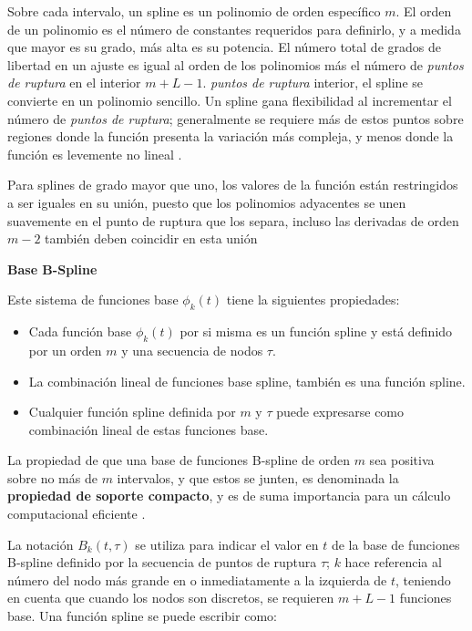 \documentclass[
]{book}
\begin{document}
Sobre cada intervalo, un spline es un polinomio de orden específico \(m\). El orden de un polinomio es el número de constantes requeridos para definirlo, y a medida que mayor es su grado, más alta es su potencia. El número total de grados de libertad en un ajuste es igual al orden de los polinomios más el número de \emph{puntos de ruptura} en el interior \(m+L-1\). \emph{puntos de ruptura} interior, el spline se convierte en un polinomio sencillo. Un spline gana flexibilidad al incrementar el número de \emph{puntos de ruptura}; generalmente se requiere más de estos puntos sobre regiones donde la función presenta la variación más compleja, y menos donde la función es levemente no lineal \citep{ramsay}.

Para splines de grado mayor que uno, los valores de la función están restringidos a ser iguales en su unión, puesto que los polinomios adyacentes se unen suavemente en el punto de ruptura que los separa, incluso las derivadas de orden \(m-2\) también deben coincidir en esta unión \citep{ramsay}

\textbf{Base B-Spline}

Este sistema de funciones base \(\phi_k(t)\) tiene la siguientes propiedades:

\begin{itemize}
\item
  Cada función base \(\phi_k(t)\) por si misma es un función spline y está definido por un orden \(m\) y una secuencia de nodos \(\tau\).
\item
  La combinación lineal de funciones base spline, también es una función spline.
\item
  Cualquier función spline definida por \(m\) y \(\tau\) puede expresarse como combinación lineal de estas funciones base.
\end{itemize}

La propiedad de que una base de funciones B-spline de orden \(m\) sea positiva sobre no más de \(m\) intervalos, y que estos se junten, es denominada la \textbf{propiedad de soporte compacto}, y es de suma importancia para un cálculo computacional eficiente \citep{ramsay}.

La notación \(B_k(t,\tau)\) se utiliza para indicar el valor en \(t\) de la base de funciones B-spline definido por la secuencia de puntos de ruptura \(\tau\); \(k\) hace referencia al número del nodo más grande en o inmediatamente a la izquierda de \(t\), teniendo en cuenta que cuando los nodos son discretos, se requieren \(m+L-1\) funciones base. Una función spline se puede escribir como:
\end{document}
